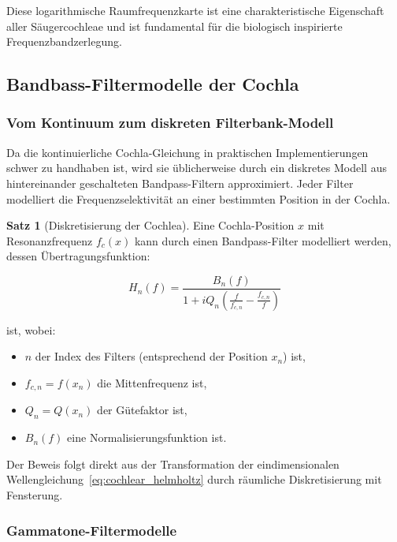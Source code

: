﻿\documentclass[12pt, a4paper]{article}
\theoremstyle{definition}
\newtheorem{satz}{Satz}[section]
\theoremstyle{remark}
\begin{document}
Diese logarithmische Raumfrequenzkarte ist eine charakteristische Eigenschaft 
aller Säugercochleae und ist fundamental für die biologisch inspirierte 
Frequenzbandzerlegung.

\subsection{Bandbass-Filtermodelle der Cochla}

\subsubsection{Vom Kontinuum zum diskreten Filterbank-Modell}

Da die kontinuierliche Cochla-Gleichung in praktischen Implementierungen schwer 
zu handhaben ist, wird sie üblicherweise durch ein diskretes Modell aus 
hintereinander geschalteten Bandpass-Filtern approximiert. Jeder Filter modelliert 
die Frequenzselektivität an einer bestimmten Position in der Cochla.

\begin{satz}[Diskretisierung der Cochlea]
\label{satz:cochlear_discretization}
Eine Cochla-Position $x$ mit Resonanzfrequenz $f_c(x)$ kann durch einen 
Bandpass-Filter modelliert werden, dessen Übertragungsfunktion:

\begin{equation}
\label{eq:bandpass_transfer}
H_n(f) = \frac{B_n(f)}{1 + i Q_n \left( \frac{f}{f_{c,n}} - \frac{f_{c,n}}{f} \right)}
\end{equation}

ist, wobei:
\begin{itemize}
\item $n$ der Index des Filters (entsprechend der Position $x_n$) ist,
\item $f_{c,n} = f(x_n)$ die Mittenfrequenz ist,
\item $Q_n = Q(x_n)$ der Gütefaktor ist,
\item $B_n(f)$ eine Normalisierungsfunktion ist.
\end{itemize}

Der Beweis folgt direkt aus der Transformation der eindimensionalen 
Wellengleichung~\eqref{eq:cochlear_helmholtz} durch räumliche Diskretisierung 
mit Fensterung.
\end{satz}

\subsubsection{Gammatone-Filtermodelle}
\end{document}
